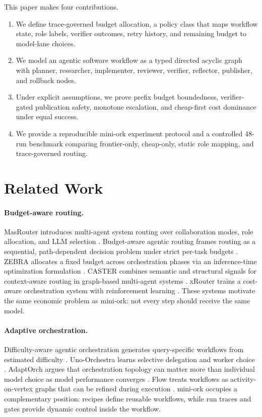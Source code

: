 \documentclass[11pt]{article}
\begin{document}
This paper makes four contributions.

\begin{enumerate}
  \item We define trace-governed budget allocation, a policy class that maps
  workflow state, role labels, verifier outcomes, retry history, and remaining
  budget to model-lane choices.
  \item We model an agentic software workflow as a typed directed acyclic graph
  with planner, researcher, implementer, reviewer, verifier, reflector,
  publisher, and rollback nodes.
  \item Under explicit assumptions, we prove prefix budget boundedness,
  verifier-gated publication safety, monotone escalation, and cheap-first cost
  dominance under equal success.
  \item We provide a reproducible mini-ork experiment protocol and a controlled
  48-run benchmark comparing frontier-only, cheap-only, static role mapping,
  and trace-governed routing.
\end{enumerate}

\section{Related Work}

\paragraph{Budget-aware routing.}
MasRouter introduces multi-agent system routing over collaboration modes, role
allocation, and LLM selection \cite{masrouter2025}. Budget-aware agentic
routing frames routing as a sequential, path-dependent decision problem under
strict per-task budgets \cite{budgetaware2026}. ZEBRA allocates a fixed budget
across orchestration phases via an inference-time optimization formulation
\cite{zebra2026}. CASTER combines semantic and structural signals for
context-aware routing in graph-based multi-agent systems \cite{caster2026}.
xRouter trains a cost-aware orchestration system with reinforcement learning
\cite{xrouter2025}. These systems motivate the same economic problem as
mini-ork: not every step should receive the same model.

\paragraph{Adaptive orchestration.}
Difficulty-aware agentic orchestration generates query-specific workflows from
estimated difficulty \cite{daao2025}. Uno-Orchestra learns selective delegation
and worker choice \cite{unoorchestra2026}. AdaptOrch argues that orchestration
topology can matter more than individual model choice as model performance
converges \cite{adaptorch2026}. Flow treats workflows as activity-on-vertex
graphs that can be refined during execution \cite{flow2025}. mini-ork occupies
a complementary position: recipes define reusable workflows, while run traces
and gates provide dynamic control inside the workflow.
\end{document}
